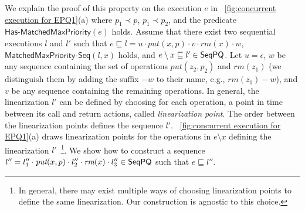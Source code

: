 We explain the proof of this property on the execution $e$ in \figurename~\ref{fig:concurrent execution for EPQ1}(a) where $p_1 \prec p$, $p_1 \prec p_2$, and the predicate $\mathsf{Has\text{-}MatchedMaxPriority}(e)$ holds. Assume that there exist two sequential executions $l$ and $l'$ such that $e \sqsubseteq l=u \cdot \textit{put}(x,p) \cdot v \cdot \textit{rm}(x) \cdot w$, $\mathsf{MatchedMaxPriority\text{-}Seq}(l,x)$ holds, and $e \setminus x \sqsubseteq l' \in \mathsf{SeqPQ}$. Let $u=\epsilon$, $w$ be any sequence containing the set of operations $\textit{put}(z_2,p_2)$ and $\textit{rm}(z_1)$ (we distinguish them by adding the suffix $-w$ to their name, e.g., $\textit{rm}(z_1)-w$), and $v$ be any sequence containing the remaining operations. In general, the linearization $l'$ can be defined by choosing for each operation, a point in time between its call and return actions, called \emph{linearization point}. The order between the linearization points defines the sequence $l'$. \figurename~\ref{fig:concurrent execution for EPQ1}(a) draws linearization points for the operations in $e \setminus x$ defining the linearization $l'$~\footnote{In general, there may exist multiple ways of choosing linearization points to define the same linearization. Our construction is agnostic to this choice.}.
We show how to construct a sequence $l''= l''_1 \cdot \textit{put}(x,p) \cdot l''_2 \cdot \textit{rm}(x) \cdot l''_3\in\mathsf{SeqPQ}$ such that $e \sqsubseteq l''$.
